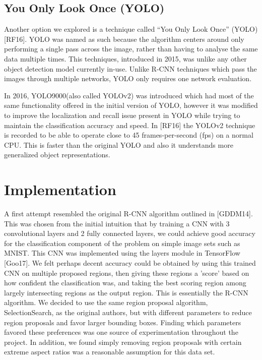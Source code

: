 \documentclass[11pt]{article}
\begin{document}
\subsection{You Only Look Once (YOLO)}\label{you-only-look-once-yolo}

Another option we explored is a technique called ``You Only Look Once''
(YOLO) {[}RF16{]}. YOLO was named as such because the algorithm centers
around only performing a single pass across the image, rather than
having to analyse the same data multiple times. This techniques,
introduced in 2015, was unlike any other object detection model
currently in-use. Unlike R-CNN techniques which pass the images through
multiple networks, YOLO only requires one network evaluation.

In 2016, YOLO9000(also called YOLOv2) was introduced which had most of
the same functionality offered in the initial version of YOLO, however
it was modified to improve the localization and recall issue present in
YOLO while trying to maintain the classification accuracy and speed. In
{[}RF16{]} the YOLOv2 technique is recorded to be able to operate close
to 45 frames-per-second (fps) on a normal CPU. This is faster than the
original YOLO and also it understands more generalized object
representations.

    \section{Implementation}\label{implementation}

    A first attempt resembled the original R-CNN algorithm outlined in
{[}GDDM14{]}. This was chosen from the initial intuition that by
training a CNN with 3 convolutional layers and 2 fully connected layers,
we could achieve good accuracy for the classification component of the
problem on simple image sets such as MNIST. This CNN was implemented
using the layers module in TensorFlow {[}Goo17{]}. We felt perhaps
decent accuracy could be obtained by using this trained CNN on multiple
proposed regions, then giving these regions a 'score' based on how
confident the classification was, and taking the best scoring region
among largely intersecting regions as the output region. This is
essentially the R-CNN algorithm. We decided to use the same region
proposal algorithm, SelectionSearch, as the original authors, but with
different parameters to reduce region proposals and favor larger
bounding boxes. Finding which parameters favored these preferences was
one source of experimentation throughout the project. In addition, we
found simply removing region proposals with certain extreme aspect
ratios was a reasonable assumption for this data set.
\end{document}
